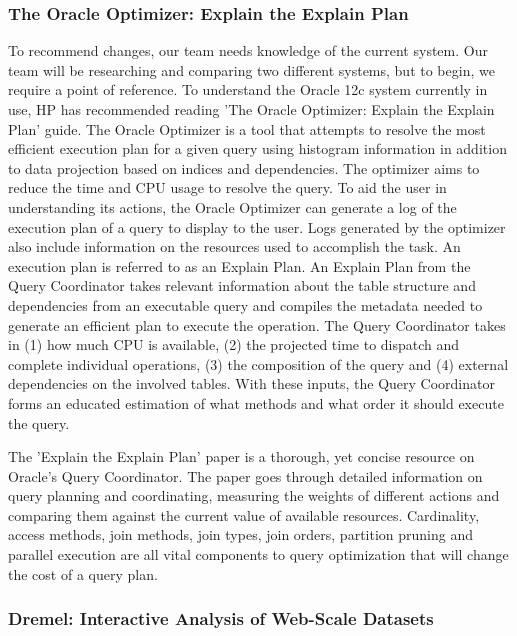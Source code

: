 \documentclass[onecolumn, draftclsnofoot,10pt, compsoc]{IEEEtran}
\begin{document}
\subsubsection{The Oracle Optimizer: Explain the Explain Plan}
To recommend changes, our team needs knowledge of the current system. 
Our team will be researching and comparing two different systems, but to begin, we require a point of reference.
To understand the Oracle 12c system currently in use, HP has recommended reading  'The Oracle Optimizer: Explain the Explain Plan’ guide.
The Oracle Optimizer is a tool that attempts to resolve the most efficient execution plan for a given query using histogram information in addition to data projection based on indices and dependencies.
The optimizer aims to reduce the time and CPU usage to resolve the query.
To aid the user in understanding its actions, the Oracle Optimizer can generate a log of the execution plan of a query  to display to the user.
Logs generated by the optimizer also include information on the resources used to accomplish the task.
An execution plan is referred to as an Explain Plan. 
An Explain Plan from the Query Coordinator takes relevant information about the table structure and dependencies from an executable query and compiles the metadata needed to generate an efficient plan to execute the operation.
The Query Coordinator takes in (1) how much CPU is available, (2) the projected time to dispatch and complete individual operations, (3) the composition of the query and (4) external dependencies on the involved tables.
With these inputs, the Query Coordinator forms an educated estimation of what methods and what order it should execute the query.

The 'Explain the Explain Plan' paper is a thorough, yet concise resource on Oracle's Query Coordinator.
The paper goes through detailed information on query planning and coordinating, measuring the weights of different actions and comparing them against the current value of available resources.
Cardinality, access methods, join methods, join types, join orders, partition pruning and parallel execution are all vital components to query optimization that will change the cost of a query plan.  

\subsubsection{Dremel: Interactive Analysis of Web-Scale Datasets}



\nocite{*}


\end{document}
